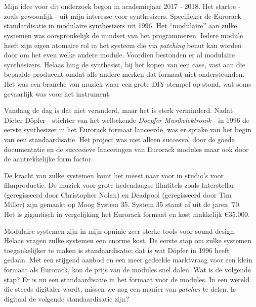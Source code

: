 
\chapter*{}
\label{ch:voorwoord}


Mijn idee voor dit onderzoek begon in academiejaar 2017 - 2018. Het startte - zoals gewoonlijk - uit mijn interesse voor synthesizers. Specifieker de Eurorack standardisatie in modulaire synthesizers uit 1996. Het ``modulaire'' aan zulke systemen was oorspronkelijk de mindset van het programmeren. Iedere module heeft zijn eigen atomaire rol in het systeem die via \textit{patching} benut kan worden door om het even welke andere module. Voordien bestonden er al modulaire synthesizers. Helaas hing de synthesist, bij het kopen van een case, vast aan die bepaalde producent omdat 	alle andere merken dat formaat niet ondersteunden. Het was een branche van muziek waar een grote DIY-stempel op stond, wat soms gevaarlijk was voor het instrument. 

Vandaag de dag is dat niet veranderd, maar het is sterk verminderd. Nadat Dieter Döpfer - stichter van het welbekende \textit{Doepfer Musikelektronik} - in 1996 de eerste synthesizer in het Eurorack formaat lanceerde, was er sprake van het begin van een standaardisatie. Het project was niet alleen succesvol door de goede documentatie en de succesieve lanceringen van Eurorack modules maar ook door de aantrekkelijke form factor.

De kracht van zulke systemen komt het meest naar voor in studio's voor filmproductie. 	De muziek voor grote hedendaagse filmtitels zoals Interstellar (geregisseerd door Christopher Nolan) en Deadpool (geregisseerd door Tim Miller) zijn gemaakt op Moog System 35. System 35 stamt af uit de jaren '70. Het is gigantisch in vergelijking het Eurorack formaat en kost makkelijk \euro 35.000.

Modulaire systemen zijn in mijn opninie zeer sterke tools voor sound design. Helaas vragen zulke systemen een enorme kost. De eerste stap om zulke systemen toegankelijker te maken is standaardisatie; dat is wat Döpfer in 1996 heeft gedaan. Met een stijgend aanbod en een meer gedeelde marktvraag voor een klein formaat als Eurorack, kon de prijs van de modules snel dalen. Wat is de volgende stap? Er is nu een standaardisatie in het formaat voor de modules. In een wereld die steeds digitaler wordt, missen we nog een manier van \textit{patches} te delen. Is digitaal de volgende standaardisatie zijn?

